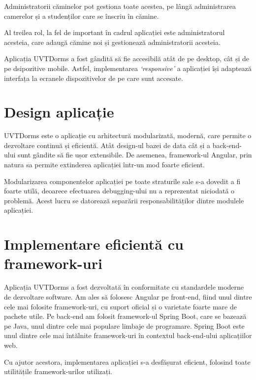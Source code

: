 \documentclass[12pt,a4paper]{report}
\theoremstyle{definition}
\theoremstyle{remark}
\begin{document}
\par Administratorii căminelor pot gestiona toate acestea, pe lângă administrarea camerelor și a studenților care se înscriu în cămine.

\par Al treilea rol, la fel de important în cadrul aplicației este administratorul acesteia, care adaugă cămine noi și gestionează administratorii acesteia.

\par Aplicația UVTDorms a fost gândită să fie accesibilă atât de pe desktop, cât și de pe dsipozitive mobile. Astfel, implementarea \textit{`responsive'} a aplicației își adaptează interfața la ecranele dispozitivelor de pe care sunt accesate. 

\section{Design aplicație}

\par UVTDorms este o aplicație cu arhitectură modularizată, modernă, care permite o dezvoltare continuă și eficientă. Atât design-ul bazei de data cât și a back-end-ului sunt gândite să fie ușor extensibile. De asemenea, framework-ul Angular, prin natura sa permite extinderea aplicației într-un mod foarte eficient.

\par Modularizarea componentelor aplicației pe toate straturile sale s-a dovedit a fi foarte utilă, deoarece efectuarea debugging-ului nu a reprezentat niciodată o problemă. Acest lucru se datorează separării responsabilităților dintre modulele aplicației.

\section{Implementare eficientă cu framework-uri}

\par Aplicația UVTDorms a fost dezvoltată în conformitate cu standardele moderne de dezvoltare software. Am ales să folosesc Angular pe front-end, fiind unul dintre cele mai folosite framework-uri, cu suport oficial și o varietate foarte mare de pachete utile. Pe back-end am folosit framework-ul Spring Boot, care se bazează pe Java, unul dintre cele mai populare limbaje de programare. Spring Boot este unul dintre cele mai întălnite framework-uri în contextul back-end-ului aplicațiilor web.

\par Cu ajutor acestora, implementarea aplicației s-a desfășurat eficient, folosind toate utilitățile framework-urilor utilizați.
\end{document}
